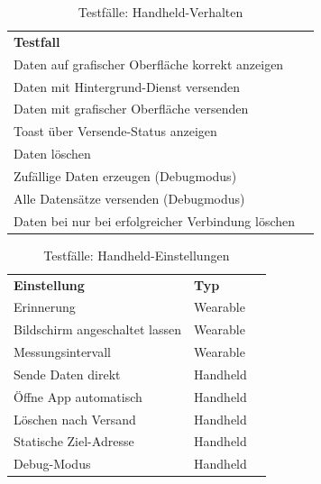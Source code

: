 \begin{table}[h]
	\centering
		\begin{tabularx}{\linewidth}{Xc}
			\textbf{Testfall}																		& \\
			Daten auf grafischer Oberfläche korrekt anzeigen		& \ok \\
			Daten mit Hintergrund-Dienst versenden							& \ok \\
			Daten mit grafischer Oberfläche versenden						& \ok \\
			Toast über Versende-Status anzeigen									& \ok \\
			Daten löschen			 																	& \ok \\
			Zufällige Daten erzeugen (Debugmodus)								& \ok \\
			Alle Datensätze versenden (Debugmodus)							& \ok \\
			Daten bei nur bei erfolgreicher Verbindung löschen	& \ok \\
		\end{tabularx}
		\caption{Testfälle: Handheld-Verhalten}
		\label{tbl:testcases_handheld_behavior}
\end{table}

\begin{table}[h]
	\centering
		\begin{tabularx}{\linewidth}{Xlc}
			\textbf{Einstellung}						& \textbf{Typ} 				& \\
			Erinnerung											& Wearable 						& \ok \\
			Bildschirm angeschaltet lassen 	& Wearable 						& \ok \\
			Messungsintervall 							& Wearable 						& \ok \\
			Sende Daten direkt 							& Handheld 						& \ok \\
			Öffne App automatisch						& Handheld 						& \ok \\
			Löschen nach Versand						& Handheld 						& \ok \\
			Statische Ziel-Adresse					& Handheld 						& \ok \\
			Debug-Modus							 				& Handheld 						& \ok \\
		\end{tabularx}
		\caption{Testfälle: Handheld-Einstellungen}
		\label{tbl:testcases_handheld_settings}
\end{table}



